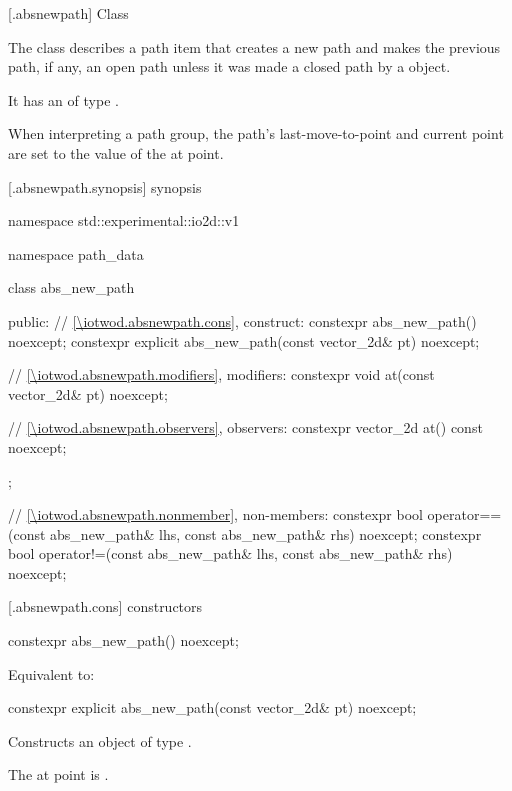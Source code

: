  [\iotwod.absnewpath] {Class }

\pnum
{}%
The class  describes a path item that creates a new path and makes the previous path, if any, an open path unless it was made a closed path by a  object.

\pnum
It has an  of type .

\pnum
When interpreting a path group, the path's last-move-to-point and current point are set to the value of the at point.

 [\iotwod.absnewpath.synopsis] { synopsis}%

\begin{codeblock}
namespace std::experimental::io2d::v1 {
  namespace path_data {
    class abs_new_path {
    public:
      // \ref{\iotwod.absnewpath.cons}, construct:
      constexpr abs_new_path() noexcept;
      constexpr explicit abs_new_path(const vector_2d& pt) noexcept;

      // \ref{\iotwod.absnewpath.modifiers}, modifiers:
      constexpr void at(const vector_2d& pt) noexcept;

      // \ref{\iotwod.absnewpath.observers}, observers:
      constexpr vector_2d at() const noexcept;
    };
    
    // \ref{\iotwod.absnewpath.nonmember}, non-members:
    constexpr bool operator==(const abs_new_path& lhs, const abs_new_path& rhs) 
      noexcept;
    constexpr bool operator!=(const abs_new_path& lhs, const abs_new_path& rhs) 
      noexcept;
  }
}
\end{codeblock}

 [\iotwod.absnewpath.cons] { constructors}%

%
\begin{itemdecl}
constexpr abs_new_path() noexcept;
\end{itemdecl}
\begin{itemdescr}
\pnum
\effects
Equivalent to: 
\end{itemdescr}

%
\begin{itemdecl}
constexpr explicit abs_new_path(const vector_2d& pt) noexcept;
\end{itemdecl}
\begin{itemdescr}
\pnum
\effects
Constructs an object of type .

\pnum
The at point is .
\end{itemdescr}

